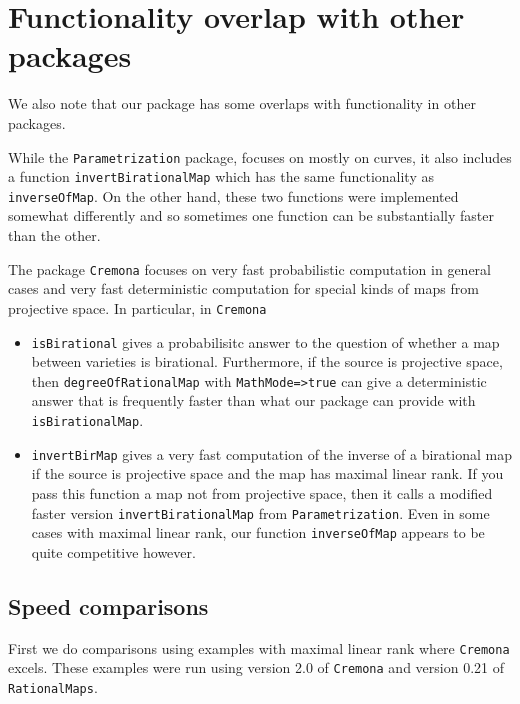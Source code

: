 \documentclass[11pt]{amsart}
\numberwithin{equation}{theorem}
\renewcommand{\:}{\colon}
\theoremstyle{theorem}
\begin{document}
{\normalsize
\section{Functionality overlap with other packages}
We also note that our package has some overlaps with functionality in other packages.

While the {\tt Parametrization} package, focuses on mostly on curves, it also includes a function {\tt invertBirationalMap} which has the same functionality as {\tt inverseOfMap}. On the other hand, these two functions were implemented somewhat differently and so sometimes one function can be substantially faster than the other.

The package {\tt Cremona} focuses on very fast probabilistic computation in general cases and very fast deterministic computation for special kinds of maps from projective space. In particular, in {\tt Cremona} 

\begin{itemize}
\item{}     {\tt isBirational} gives a probabilisitc answer to the question of whether a map between varieties is birational. Furthermore, if the source is projective space, then {\tt degreeOfRationalMap} with {\tt MathMode=>true} can give a deterministic answer that is frequently faster than what our package can provide with {\tt isBirationalMap}.
\item{}  {\tt invertBirMap} gives a very fast computation of the inverse of a birational map if the source is projective space and the map has maximal linear rank. If you pass this function a map not from projective space, then it calls a modified faster version {\tt invertBirationalMap} from {\tt Parametrization}. Even in some cases with maximal linear rank, our function {\tt inverseOfMap} appears to be quite competitive however.  
\end{itemize}

\subsection{Speed comparisons}

First we do comparisons using examples with maximal linear rank where {\tt Cremona} excels.  These examples were run using version 2.0 of {\tt Cremona} and version 0.21 of {\tt RationalMaps}.

}
\end{document}
